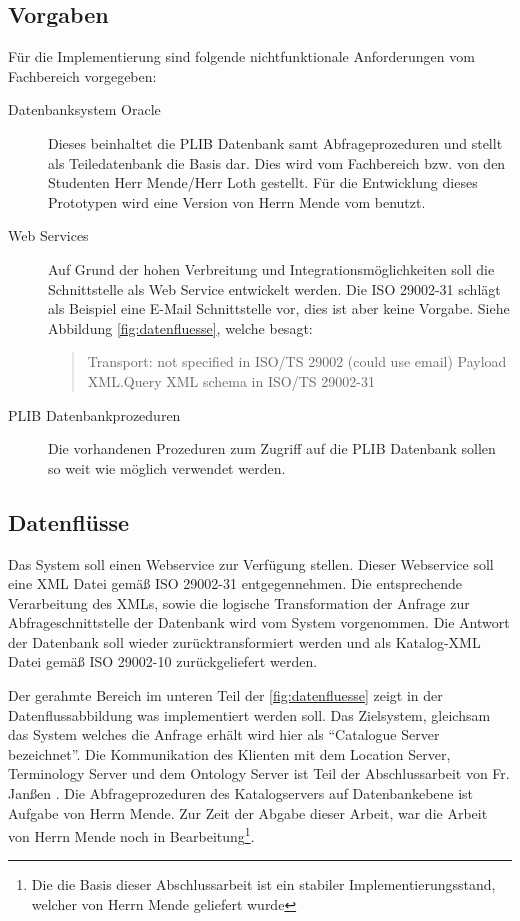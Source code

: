 \subsection{Vorgaben}

Für die Implementierung sind folgende nichtfunktionale Anforderungen vom Fachbereich vorgegeben:
\begin{description}
\item[Datenbanksystem Oracle] Dieses beinhaltet die PLIB Datenbank samt Abfrageprozeduren und stellt als Teiledatenbank die Basis dar. Dies wird vom Fachbereich bzw. von den Studenten Herr Mende/Herr Loth gestellt. Für die Entwicklung dieses Prototypen wird eine Version von Herrn Mende vom  benutzt.  
\item[Web Services] Auf Grund der hohen Verbreitung und Integrationsmöglichkeiten soll die Schnittstelle als Web Service entwickelt werden. Die ISO 29002-31 schlägt als Beispiel eine E-Mail Schnittstelle vor, dies ist aber keine Vorgabe. Siehe Abbildung \autoref{fig:datenfluesse}, welche besagt:
\begin{quotation}
Transport: not specified in ISO/TS 29002 (could use email) Payload XML.Query XML schema in ISO/TS 29002-31
\end{quotation}
\item[PLIB Datenbankprozeduren] Die vorhandenen Prozeduren zum Zugriff auf die PLIB Datenbank sollen so weit wie möglich verwendet werden. 
\end{description}

\subsection{Datenflüsse}
Das System soll einen \gls{Webservice} zur Verfügung stellen. Dieser \gls{Webservice} soll eine XML Datei gemäß ISO 29002-31 entgegennehmen. Die entsprechende Verarbeitung des XMLs, sowie die logische Transformation der Anfrage zur Abfrageschnittstelle der Datenbank wird vom System vorgenommen. Die Antwort der Datenbank soll wieder zurücktransformiert werden und als Katalog-XML Datei gemäß ISO 29002-10 zurückgeliefert werden.
 
Der gerahmte Bereich im unteren Teil der \autoref{fig:datenfluesse} zeigt in der Datenflussabbildung was implementiert werden soll. Das Zielsystem, gleichsam das System welches die Anfrage erhält wird hier als \enquote{Catalogue Server bezeichnet}. 
Die Kommunikation des Klienten mit dem Location Server, Terminology Server und dem Ontology Server ist Teil der Abschlussarbeit von Fr. Janßen \citep[Vergl.][]{janssen}. 
Die Abfrageprozeduren des Katalogservers auf Datenbankebene ist Aufgabe von Herrn Mende. Zur Zeit der Abgabe dieser Arbeit, war die Arbeit von Herrn Mende noch in Bearbeitung\footnote{Die die Basis dieser Abschlussarbeit ist ein stabiler Implementierungsstand, welcher von Herrn Mende geliefert wurde}. 


